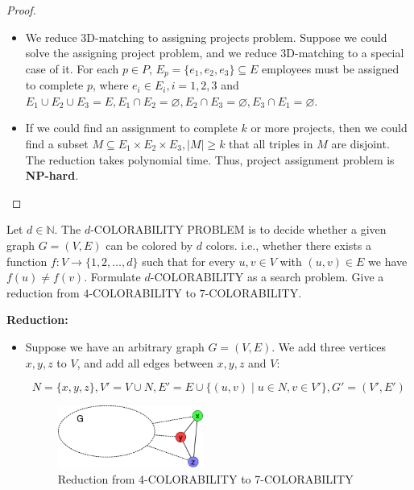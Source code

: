 \documentclass{article}
\newcounter{exercise}
\newcommand{\<}{
    \langle}
\renewcommand{\>}{
    \rangle}
\begin{document}
{\begin{proof}
\begin{itemize}
        \item We reduce 3D-matching to assigning projects problem. Suppose we could solve the assigning project problem, and we reduce 3D-matching to a special case of it. For each $p\in P$, $E_p=\{e_1,e_2,e_3\}\subseteq E$ employees must be assigned to complete $p$, where $e_i\in E_i,i=1,2,3$ and $E_1\cup E_2\cup E_3=E,E_1\cap E_2=\varnothing,E_2\cap E_3=\varnothing,E_3\cap E_1=\varnothing$.
        \item If we could find an assignment to complete $k$ or more projects, then we could find a subset $M\subseteq E_1\times E_2\times E_3,|M|\geq k$ that all triples in $M$ are disjoint. The reduction takes polynomial time. Thus, project assignment problem is \textbf{NP-hard}.
    \end{itemize}
\end{proof}

\newpage

\begin{exercise}
Let $d\in \mathbb{N}$. The $d$-\textsf{COLORABILITY PROBLEM} is to decide whether a given graph $G=(V,E)$ can be colored by $d$ colors. i.e., whether there exists a function $f:V\rightarrow \{1,2,\ldots,d\}$ such that for every $u,v\in V$ with $(u,v)\in E$ we have $f(u)\neq f(v)$. Formulate  $d$-\textsf{COLORABILITY} as a search problem. Give a reduction from $4$-\textsc{COLORABILITY} to $7$-\textsc{COLORABILITY}.
\end{exercise}

\leavevmode\newline

\textbf{Reduction:} 
\begin{itemize}
\item Suppose we have an arbitrary graph $G=(V,E)$. We add three vertices $x,y,z$ to $V$, and add all edges between $x,y,z$ and $V$:

\begin{displaymath} 
    N=\{x,y,z\},V'=V\cup N, E'=E\cup \{(u,v)\mid u\in N, v \in V'\},G'=(V',E')
\end{displaymath}

\begin{figure}[!htp]
    \centering
    \includegraphics[width=0.45\textwidth]{img/6.jpg}
    \caption{Reduction from 4-COLORABILITY to 7-COLORABILITY}
    \label{ggg}
  \end{figure}


\end{itemize}}
\end{document}
